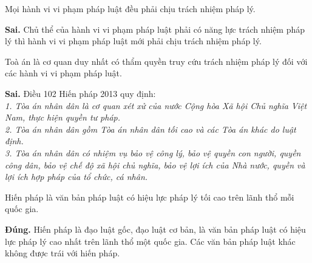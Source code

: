 \begin{ques}
Mọi hành vi vi phạm pháp luật đều phải chịu trách nhiệm pháp lý.
\end{ques}
\begin{ans}
\textbf{Sai.} Chủ thể của hành vi vi phạm pháp luật phải có năng lực trách nhiệm pháp lý thì hành vi vi phạm pháp luật mới phải chịu trách nhiệm pháp lý.
\end{ans}

\begin{ques}
Toà án là cơ quan duy nhất có thẩm quyền truy cứu trách nhiệm pháp lý đối với các hành vi vi phạm pháp luật.
\end{ques}
\begin{ans}
\textbf{Sai.} Điều 102 Hiến pháp 2013 quy định:\\
\textit{1. Tòa án nhân dân là cơ quan xét xử của nước Cộng hòa Xã hội Chủ nghĩa Việt Nam, thực hiện quyền tư pháp.} \\
\textit{2. Tòa án nhân dân gồm Tòa án nhân dân tối cao và các Tòa án khác do luật định.}\\
\textit{3. Tòa án nhân dân có nhiệm vụ bảo vệ công lý, bảo vệ quyền con người, quyền công dân, bảo vệ chế độ xã hội chủ nghĩa, bảo vệ lợi ích của Nhà nước, quyền và lợi ích hợp pháp của tổ chức, cá nhân.}
\end{ans}

\begin{ques}
Hiến pháp là văn bản pháp luật có hiệu lực pháp lý tối cao trên lãnh thổ mỗi quốc gia.
\end{ques}
\begin{ans}
\textbf{Đúng.} Hiến pháp là đạo luật gốc, đạo luật cơ bản, là văn bản pháp luật có hiệu lực pháp lý cao nhất trên lãnh thổ một quốc gia. Các văn bản pháp luật khác không được trái với hiến pháp.
\end{ans}


